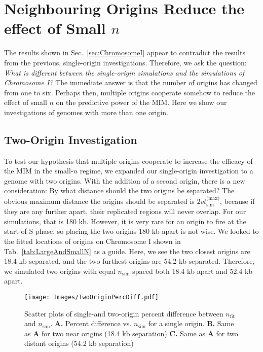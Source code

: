 	
	\section{Neighbouring Origins Reduce the effect of Small $n$}
	\label{sec: NearOrigins}
	
	The results shown in Sec.~\ref{sec:ChromosomeI} appear to contradict the results from the previous, single-origin investigations.
	Therefore, we ask the question: \emph{What is different between the single-origin simulations and the simulations of Chromosome I?}
	The immediate answer is that the number of origins has changed from one to six.
	Perhaps then, multiple origins cooperate somehow to reduce the effect of small $n$ on the predictive power of the MIM.
	Here we show our investigations of genomes with more than one origin.
	
		\subsection{Two-Origin Investigation}
		\label{subsec:TwoOrigins}
		
		To test our hypothesis that multiple origins cooperate to increase the efficacy of the MIM in the small-$n$ regime, we expanded our single-origin investigation to a genome with two origins.
		With the addition of a second origin, there is a new consideration: By what distance should the two origins be separated?
		The obvious maximum distance the origins should be separated is $2vt_\text{sim}^\text{(max)}$, because if they are any further apart, their replicated regions will never overlap.
		For our simulations, that is 180 kb.
		However, it is very rare for an origin to fire at the start of S phase, so placing the two origins 180 kb apart is not wise.
		We looked to the fitted locations of origins on Chromosome I shown in Tab.~\ref{tab:LargeAndSmallN} as a guide.
		Here, we see the two closest origins are 18.4 kb separated, and the two furthest origins are 54.2 kb separated.
		Therefore, we simulated two origins with equal $n_\text{sim}$ spaced both 18.4 kb apart and 52.4 kb apart.
		
	\begin{figure}[tbh]
		\begin{center}
			\texttt{[image: Images/TwoOriginPercDiff.pdf]}
		\end{center}
			\caption[Scatter Plots of Single-and Two-Origin Percent Difference]{\label{fig:TwoOrigins} 
				Scatter plots of single-and two-origin percent difference between $n_\text{fit}$ and $n_\text{sim}$.
				\textbf{A.} Percent difference vs. $n_\text{sim}$ for a single origin.
				\textbf{B.} Same as \textbf{A} for two near origins (18.4 kb separation)
				\textbf{C.} Same as \textbf{A} for two distant origins (54.2 kb separation)
			}
	\end{figure} 
		
